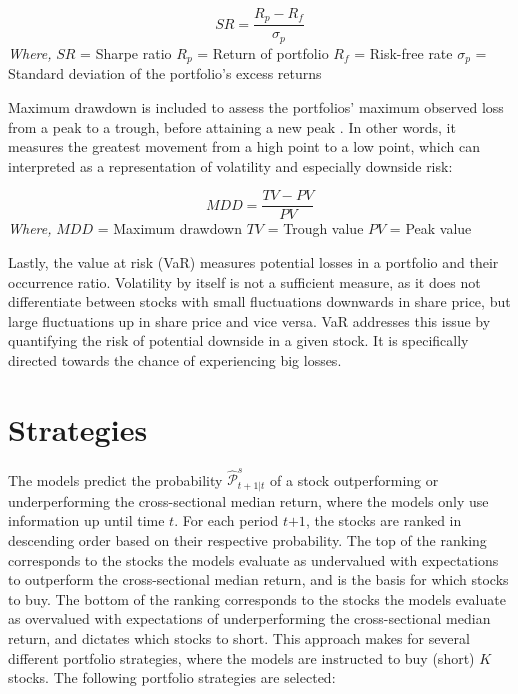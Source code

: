 \indent \newline
\begin{equation}
SR = \frac{R_{p} - R_{f}}{\sigma_{p}}
\end{equation}
\indent \newline 
\textit{Where,}
\indent \newline 
$SR$ = Sharpe ratio
\indent \newline 
$R_{p}$ = Return of portfolio
\indent \newline 
$R_{f}$ = Risk-free rate
\indent \newline 
$\sigma_{p}$ = Standard deviation of the portfolio's excess returns

\indent \newline 
Maximum drawdown is included to assess the portfolios' maximum observed loss from a peak to a trough, before attaining a new peak \cite{hayes}. In other words, it measures the greatest movement from a high point to a low point, which can interpreted as a representation of volatility and especially downside risk:

\indent \newline
\begin{equation}
MDD = \frac{TV - PV}{PV}
\end{equation}
\indent \newline 
\textit{Where,}
\indent \newline 
$MDD$ = Maximum drawdown
\indent \newline 
$TV$ = Trough value
\indent \newline 
$PV$ = Peak value

\indent \newline
Lastly, the value at risk (VaR) measures potential losses in a portfolio and their occurrence ratio. Volatility by itself is not a sufficient measure, as it does not differentiate between stocks with small fluctuations downwards in share price, but large fluctuations up in share price and vice versa. VaR addresses this issue by quantifying the risk of potential downside in a given stock. It is specifically directed towards the chance of experiencing big losses.  

\section{Strategies}
The models predict the probability $\widehat{\mathcal{P}}^{s}_{t+1|t}$ of a stock outperforming or underperforming the cross-sectional median return, where the models only use information up until time $\textit{t}$. For each period $\textit{t+1}$, the stocks are ranked in descending order based on their respective probability. The top of the ranking corresponds to the stocks the models evaluate as undervalued with expectations to outperform the cross-sectional median return, and is the basis for which stocks to buy. The bottom of the ranking corresponds to the stocks the models evaluate as overvalued with expectations of underperforming the cross-sectional median return, and dictates which stocks to short. This approach makes for several different portfolio strategies, where the models are instructed to buy (short) $\textit{K}$ stocks. The following portfolio strategies are selected:

